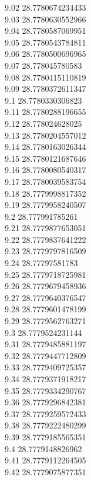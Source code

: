 {9.02	28.7780674234433\\
9.03	28.7780630552966\\
9.04	28.7780587069951\\
9.05	28.7780543784811\\
9.06	28.7780500696965\\
9.07	28.778045780583\\
9.08	28.7780415110819\\
9.09	28.7780372611347\\
9.1	28.7780330306823\\
9.11	28.7780288196655\\
9.12	28.778024628025\\
9.13	28.7780204557012\\
9.14	28.7780163026344\\
9.15	28.7780121687646\\
9.16	28.7780080540317\\
9.17	28.7780039583754\\
9.18	28.7779998817352\\
9.19	28.7779958240507\\
9.2	28.777991785261\\
9.21	28.7779877653051\\
9.22	28.7779837641222\\
9.23	28.7779797816509\\
9.24	28.77797581783\\
9.25	28.7779718725981\\
9.26	28.7779679458936\\
9.27	28.7779640376547\\
9.28	28.7779601478199\\
9.29	28.7779562763271\\
9.3	28.7779524231144\\
9.31	28.7779485881197\\
9.32	28.7779447712809\\
9.33	28.7779409725357\\
9.34	28.7779371918217\\
9.35	28.7779334290767\\
9.36	28.7779296842381\\
9.37	28.7779259572433\\
9.38	28.7779222480299\\
9.39	28.7779185565351\\
9.4	28.7779148826962\\
9.41	28.7779112264505\\
9.42	28.7779075877351\\
}
